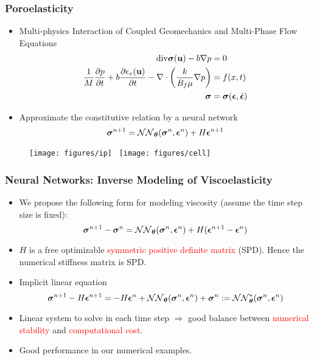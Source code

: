 \documentclass[usenames,dvipsnames]{beamer}
\newcommand{\bt}[0]{\bm{\theta}}
\newcommand{\bu}{\mathbf{u}}
\begin{document}
\begin{frame}
	
	\frametitle{Poroelasticity}
	\begin{itemize}
		\item Multi-physics Interaction of Coupled Geomechanics and Multi-Phase Flow Equations 
		{\small
			\begin{align*}
				\mathrm{div}\bsigma(\bu) - b \nabla p &= 0\\
				\frac{1}{M} \frac{\partial p}{\partial t} + b\frac{\partial \epsilon_v(\bu)}{\partial t} - \nabla\cdot\left(\frac{k}{B_f\mu}\nabla p\right) &= f(x,t)	\\
				\bsigma &= \bsigma(\bepsilon, \dot\bepsilon)
			\end{align*}
		}
		\item Approximate the constitutive relation by a neural network
		{\small
			$$\bsigma^{n+1} = \mathcal{NN}_{\bt} (\bsigma^n, \bepsilon^n) + H\bepsilon^{n+1}$$}
	\end{itemize}		
	\begin{figure}[hbt]	
		\centering
		\texttt{[image: figures/ip]}~
		\texttt{[image: figures/cell]}
	\end{figure}
	
\end{frame}



\begin{frame}
	\frametitle{Neural Networks: Inverse Modeling of Viscoelasticity}
	
	\begin{itemize}
		\item We propose the following form for modeling viscosity (assume the time step size is fixed):
		$$\bsigma^{n+1} - \bsigma^{n} = \mathcal{NN}_{\bt} (\bsigma^n, \bepsilon^n) + H (\bepsilon^{n+1} - \bepsilon^n)$$
	\end{itemize}
	\begin{itemize}
		\item $H$ is a free optimizable \textcolor{red}{symmetric positive definite matrix} (SPD). Hence the numerical stiffness matrix is SPD.
		\item Implicit linear equation
		$$\bsigma^{n+1} - H \bepsilon^{n+1} = - H \bepsilon^n
		+ \mathcal{NN}_{\bt} (\bsigma^n, \bepsilon^n) + \bsigma^{n}:= \mathcal{NN}_{\bt}^* (\bsigma^n, \bepsilon^n)$$
		\item Linear system to solve in each time step $\Rightarrow$ good balance between \textcolor{red}{numerical stability} and \textcolor{red}{computational cost}.
		\item Good performance in our numerical examples.
	\end{itemize}
\end{frame}
\end{document}
